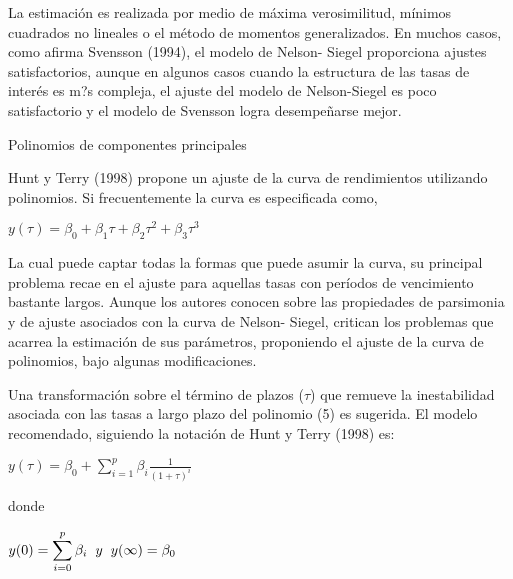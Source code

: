 \hspace*{0.4 cm} La estimaci\'on es realizada por medio de m\'axima verosimilitud, m\'inimos
cuadrados no lineales o el m\'etodo de momentos generalizados. En
muchos casos, como afirma Svensson (1994), el modelo de Nelson-
Siegel proporciona ajustes satisfactorios, aunque en algunos casos
cuando la estructura de las tasas de inter\'es es m?s compleja, el ajuste del
modelo de Nelson-Siegel es poco satisfactorio y el modelo de Svensson
logra desempe\~narse mejor.


Polinomios de componentes principales

\hspace*{0.4 cm} Hunt y Terry (1998) propone un ajuste de la curva de rendimientos
utilizando polinomios. Si frecuentemente la curva es especificada como,

\begin{center}
$\displaystyle{y(\tau) = \beta_{0} + \beta_{1}\tau +\beta_{2}\tau^2 +\beta_{3}\tau^3}$
\end{center}


\hspace*{0.4 cm} La cual puede captar todas la formas que puede asumir la curva, su
principal problema recae en el ajuste para aquellas tasas con per\'iodos de
vencimiento bastante largos. Aunque los autores conocen sobre las
propiedades de parsimonia y de ajuste asociados con la curva de Nelson-
Siegel, critican los problemas que acarrea la estimaci\'on de sus
par\'ametros, proponiendo el ajuste de la curva de polinomios, bajo
algunas modificaciones.

\hspace*{0.4 cm} Una transformaci\'on sobre el t\'ermino de plazos ($\tau$) que remueve la
inestabilidad asociada con las tasas a largo plazo del polinomio (5) es
sugerida. El modelo recomendado, siguiendo la notaci\'on de Hunt y
Terry (1998) es:

\begin{center}
$\displaystyle{y(\tau) = \beta_{0} + \sum_{i=1}^{p} \beta_{i} \frac{1}{(1+\tau)^i}} $
\end{center} 

\noindent donde

\begin{center}
$\displaystyle{y(0) = \sum_{i=0}^{p}\beta_{i} \hspace*{0.2 cm} y \hspace*{0.2 cm} y(\infty) = \beta_{0}   }$
\end{center} 


